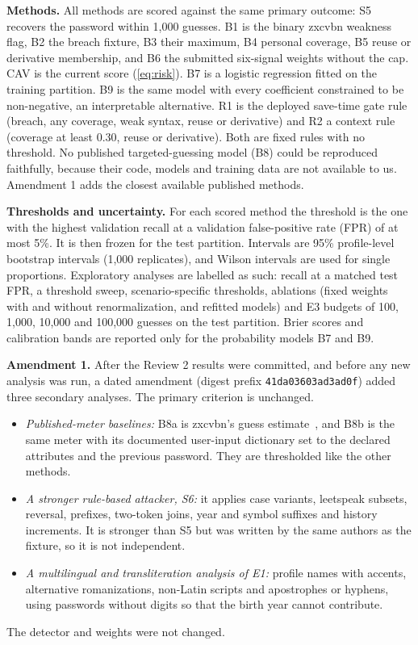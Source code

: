 \documentclass[conference]{IEEEtran}
\begin{document}
\textbf{Methods.} All methods are scored against the same primary outcome: S5 recovers the password within 1,000 guesses. B1 is the binary zxcvbn weakness flag, B2 the breach fixture, B3 their maximum, B4 personal coverage, B5 reuse or derivative membership, and B6 the submitted six-signal weights without the cap. CAV is the current score (\ref{eq:risk}). B7 is a logistic regression fitted on the training partition. B9 is the same model with every coefficient constrained to be non-negative, an interpretable alternative. R1 is the deployed save-time gate rule (breach, any coverage, weak syntax, reuse or derivative) and R2 a context rule (coverage at least 0.30, reuse or derivative). Both are fixed rules with no threshold. No published targeted-guessing model (B8) could be reproduced faithfully, because their code, models and training data are not available to us. Amendment 1 adds the closest available published methods.

\textbf{Thresholds and uncertainty.} For each scored method the threshold is the one with the highest validation recall at a validation false-positive rate (FPR) of at most 5\%. It is then frozen for the test partition. Intervals are 95\% profile-level bootstrap intervals (1,000 replicates), and Wilson intervals are used for single proportions. Exploratory analyses are labelled as such: recall at a matched test FPR, a threshold sweep, scenario-specific thresholds, ablations (fixed weights with and without renormalization, and refitted models) and E3 budgets of 100, 1,000, 10,000 and 100,000 guesses on the test partition. Brier scores and calibration bands are reported only for the probability models B7 and B9.

\textbf{Amendment 1.} After the Review 2 results were committed, and before any new analysis was run, a dated amendment (digest prefix \texttt{41da03603ad3ad0f}) added three secondary analyses. The primary criterion is unchanged.
\begin{itemize}
\item \emph{Published-meter baselines:} B8a is zxcvbn's guess estimate~\cite{wheeler}, and B8b is the same meter with its documented user-input dictionary set to the declared attributes and the previous password. They are thresholded like the other methods.
\item \emph{A stronger rule-based attacker, S6:} it applies case variants, leetspeak subsets, reversal, prefixes, two-token joins, year and symbol suffixes and history increments. It is stronger than S5 but was written by the same authors as the fixture, so it is not independent.
\item \emph{A multilingual and transliteration analysis of E1:} profile names with accents, alternative romanizations, non-Latin scripts and apostrophes or hyphens, using passwords without digits so that the birth year cannot contribute.
\end{itemize}
The detector and weights were not changed.
\end{document}
